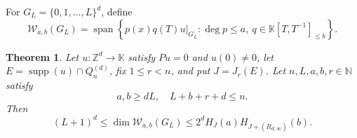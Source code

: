 \documentclass[11pt,reqno]{amsart}
\newcommand\N{\ensuremath{\mathbb{N}}}
\newcommand\K{\ensuremath{\mathbb{K}}}
\newcommand\Z{\ensuremath{\mathbb{Z}}}
\newcommand{\supp}{\operatorname{supp}}
\newtheorem{theorem}{Theorem}[section]
\theoremstyle{definition}
\theoremstyle{plain}
\numberwithin{equation}{section}
\begin{document}
  For
$G_L=\{0,1,\ldots,L\}^d$, define
\begin{equation*}
 \mathcal{W}_{a,b}(G_L)=\operatorname{span}\left\{
   \left.p(x)q(T)u\right|_{G_L}:
   \deg p\le a,\ q\in \K[T,T^{-1}]_{\le b}\right\}.
\end{equation*}

\begin{theorem}\label{thm:uncertainty}
Let $u:\Z^d\to\K$ satisfy $Pu=0$ and $u(0)\ne0$, let
$E=\supp(u)\cap Q_n^{(d)}$, fix $1\le r<n$, and put
$J=J_r(E)$.  Let $n,L,a,b,r\in \N$ satisfy
\begin{equation}\label{eq:margin}
        a,b\ge dL,
        \quad L+b+r+d\le n.
\end{equation}
Then
\begin{equation}\label{eq:uncertainty}
 (L+1)^d
 \le \dim\mathcal{W}_{a,b}(G_L)
 \le 2^d H_J(a)H_{J+(R_{d,\infty})}(b).
\end{equation}
\end{theorem}
\end{document}

